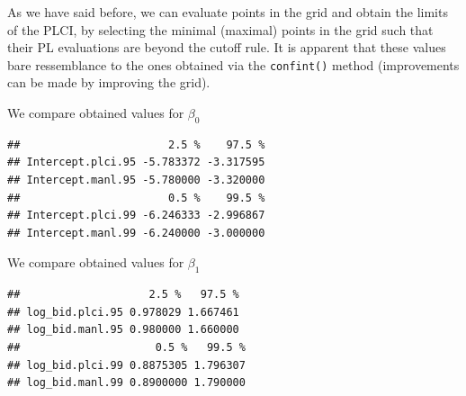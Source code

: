 \documentclass[a4paper,12pt]{article}\usepackage[]{graphicx}\usepackage[]{color}
\makeatletter
\newenvironment{kframe}{%
 \def\at@end@of@kframe{}%
 \ifinner\ifhmode%
  \def\at@end@of@kframe{\end{minipage}}%
  \begin{minipage}{\columnwidth}%
 \fi\fi%
 \def\FrameCommand##1{\hskip\@totalleftmargin \hskip-\fboxsep
 \colorbox{shadecolor}{##1}\hskip-\fboxsep
     \hskip-\linewidth \hskip-\@totalleftmargin \hskip\columnwidth}%
 \MakeFramed {\advance\hsize-\width
   \@totalleftmargin\z@ \linewidth\hsize
   \@setminipage}}%
 {\par\unskip\endMakeFramed%
 \at@end@of@kframe}
\newenvironment{knitrout}{}{} %
\makeatother
\begin{document}
\begin{enumerate}
\begin{enumerate}
{\color{blue} As we have said before, we can evaluate points in the grid and obtain the limits of the PLCI, by selecting the minimal (maximal) points in the grid such that their PL evaluations are beyond the cutoff rule. It is apparent that these values bare ressemblance to the ones obtained via the \texttt{confint()} method (improvements can be made by improving the grid).}

We compare obtained values for $\beta_0$
\begin{knitrout}
\color{fgcolor}\begin{kframe}
\begin{verbatim}
##                       2.5 %    97.5 %
## Intercept.plci.95 -5.783372 -3.317595
## Intercept.manl.95 -5.780000 -3.320000
##                       0.5 %    99.5 %
## Intercept.plci.99 -6.246333 -2.996867
## Intercept.manl.99 -6.240000 -3.000000
\end{verbatim}
\end{kframe}
\end{knitrout}

We compare obtained values for $\beta_1$
\begin{knitrout}
\color{fgcolor}\begin{kframe}
\begin{verbatim}
##                    2.5 %   97.5 %
## log_bid.plci.95 0.978029 1.667461
## log_bid.manl.95 0.980000 1.660000
##                     0.5 %   99.5 %
## log_bid.plci.99 0.8875305 1.796307
## log_bid.manl.99 0.8900000 1.790000
\end{verbatim}
\end{kframe}
\end{knitrout}

\end{enumerate}
\end{enumerate}
\end{document}
